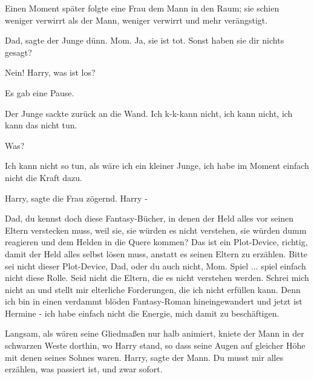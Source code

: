Einen Moment später folgte eine Frau dem Mann in den Raum; sie schien weniger
verwirrt als der Mann, weniger verwirrt und mehr verängstigt.

\glqq{}Dad\grqq{}, sagte der Junge dünn. \glqq{}Mom. Ja, sie ist tot. Sonst haben
sie dir nichts gesagt?\grqq{}

\glqq{}Nein! Harry, was ist los?\grqq{}

Es gab eine Pause.

Der Junge sackte zurück an die Wand. \glqq{}Ich k-k-kann nicht, ich kann nicht,
ich kann das nicht tun.\grqq{}

\glqq{}Was?\grqq{}

\glqq{}Ich kann nicht so tun, als wäre ich ein kleiner Junge, ich habe im Moment
einfach nicht die Kraft dazu.\grqq{}

\glqq{}Harry\grqq{}, sagte die Frau zögernd. \glqq{}Harry -\grqq{}

\glqq{}Dad, du kennst doch diese Fantasy-Bücher, in denen der Held alles vor
seinen Eltern verstecken muss, weil sie, sie würden es nicht verstehen, sie
würden dumm reagieren und dem Helden in die Quere kommen? Das ist ein
Plot-Device, richtig, damit der Held alles selbst lösen muss, anstatt es seinen
Eltern zu erzählen. Bitte sei nicht dieser Plot-Device, Dad, oder du auch nicht,
Mom. Spiel ... spiel einfach nicht diese Rolle. Seid nicht die Eltern, die es
nicht verstehen werden. Schrei mich nicht an und stellt mir elterliche
Forderungen, die ich nicht erfüllen kann. Denn ich bin in einen verdammt blöden
Fantasy-Roman hineingewandert und jetzt ist Hermine - ich habe einfach nicht die
Energie, mich damit zu beschäftigen.\grqq{}

Langsam, als wären seine Gliedmaßen nur halb animiert, kniete der Mann in der
schwarzen Weste dorthin, wo Harry stand, so dass seine Augen auf gleicher Höhe
mit denen seines Sohnes waren. \glqq{}Harry\grqq{}, sagte der Mann. \glqq{}Du
musst mir alles erzählen, was passiert ist, und zwar sofort.\grqq{}

